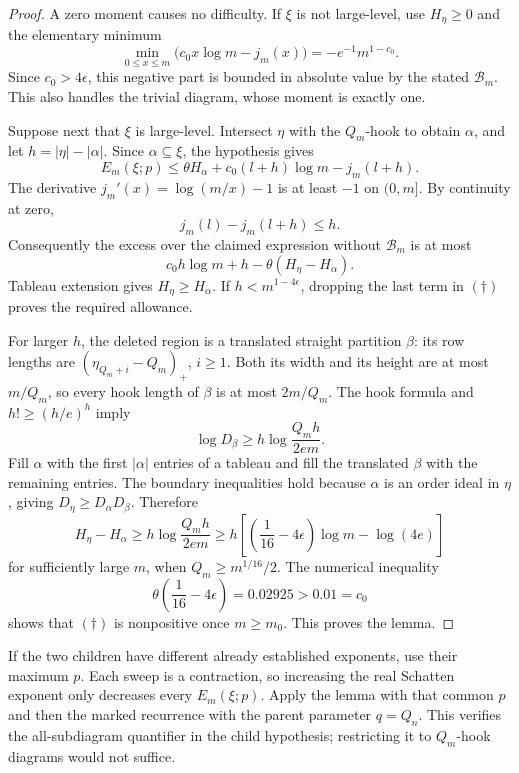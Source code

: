 \begin{proof}
A zero moment causes no difficulty.  If $\xi$ is not large-level, use
$H_\eta\ge0$ and the elementary minimum
\[
 \min_{0\le x\le m}
 \bigl(c_0x\log m-j_m(x)\bigr)
 =-e^{-1}m^{1-c_0}.
\]
Since $c_0>4\epsilon$, this negative part is bounded in absolute value
by the stated $\mathcal B_m$.  This also handles the trivial diagram, whose
moment is exactly one.

Suppose next that $\xi$ is large-level.  Intersect $\eta$ with the
$Q_m$-hook to obtain $\alpha$, and let
$h=|\eta|-|\alpha|$.  Since $\alpha\subseteq\xi$, the hypothesis gives
\[
 E_m(\xi;p)
 \le\theta H_\alpha+c_0(l+h)\log m-j_m(l+h).
\]
The derivative $j_m'(x)=\log(m/x)-1$ is at least $-1$ on $(0,m]$.
By continuity at zero,
\[
 j_m(l)-j_m(l+h)\le h.
\]
Consequently the excess over the claimed expression without $\mathcal B_m$ is
at most
\[
 c_0h\log m+h-\theta(H_\eta-H_\alpha).
 \tag{$\dagger$}
\]
Tableau extension gives $H_\eta\ge H_\alpha$.  If
$h<m^{1-4\epsilon}$, dropping the last term in $(\dagger)$ proves the
required allowance.

For larger $h$, the deleted region is a translated straight partition
$\beta$: its row lengths are
$(\eta_{Q_m+i}-Q_m)_+$, $i\ge1$.  Both its width and its height are at
most $m/Q_m$, so every hook length of $\beta$ is at most $2m/Q_m$.
The hook formula and $h!\ge(h/e)^h$ imply
\[
 \log D_\beta\ge h\log\frac{Q_mh}{2em}.
\]
Fill $\alpha$ with the first $|\alpha|$ entries of a tableau and fill
the translated $\beta$ with the remaining entries.  The boundary
inequalities hold because $\alpha$ is an order ideal in $\eta$, giving
$D_\eta\ge D_\alpha D_\beta$.  Therefore
\[
 H_\eta-H_\alpha
 \ge h\log\frac{Q_mh}{2em}
 \ge h\left[\left(\frac1{16}-4\epsilon\right)\log m-\log(4e)\right]
\]
for sufficiently large $m$, when $Q_m\ge m^{1/16}/2$.  The numerical
inequality
\[
 \theta\left(\frac1{16}-4\epsilon\right)
 =0.02925>0.01=c_0
\]
shows that $(\dagger)$ is nonpositive once $m\ge m_0$.  This proves the
lemma.
\end{proof}

If the two children have different already established exponents, use
their maximum $p$.  Each sweep is a contraction, so increasing the real
Schatten exponent only decreases every $E_m(\xi;p)$.  Apply the lemma
with that common $p$ and then the marked recurrence with the parent
parameter $q=Q_n$.  This verifies the all-subdiagram quantifier in the
child hypothesis; restricting it to $Q_m$-hook diagrams would not suffice.

